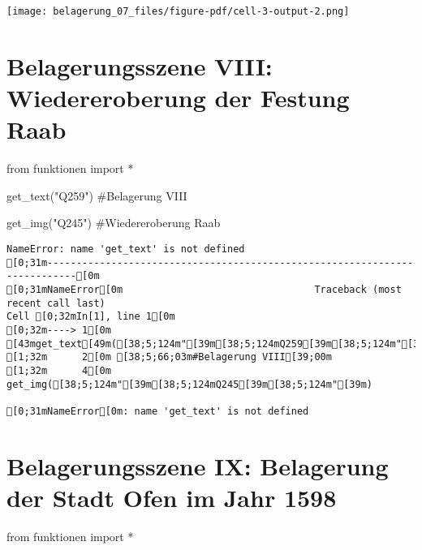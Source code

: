 \documentclass[
  a4paper,
  portrait]{book}
\newenvironment{Shaded}{\begin{snugshade}}{\end{snugshade}}
\newcommand{\CommentTok}[1]{\textcolor[rgb]{0.37,0.37,0.37}{#1}}
\newcommand{\ImportTok}[1]{\textcolor[rgb]{0.00,0.46,0.62}{#1}}
\newcommand{\NormalTok}[1]{\textcolor[rgb]{0.00,0.23,0.31}{#1}}
\newcommand{\OperatorTok}[1]{\textcolor[rgb]{0.37,0.37,0.37}{#1}}
\newcommand{\StringTok}[1]{\textcolor[rgb]{0.13,0.47,0.30}{#1}}
\begin{document}
\texttt{[image: belagerung\_07\_files/figure-pdf/cell-3-output-2.png]}

\chapter{Belagerungsszene VIII: Wiedereroberung der Festung
Raab}\label{belagerungsszene-viii-wiedereroberung-der-festung-raab}

\begin{Shaded}
\begin{Highlighting}[]
\ImportTok{from}\NormalTok{ funktionen }\ImportTok{import} \OperatorTok{*}
\end{Highlighting}
\end{Shaded}

\begin{Shaded}
\begin{Highlighting}[]
\NormalTok{get\_text(}\StringTok{"Q259"}\NormalTok{)}
\CommentTok{\#Belagerung VIII}

\NormalTok{get\_img(}\StringTok{"Q245"}\NormalTok{)}
\CommentTok{\#Wiedereroberung Raab }
\end{Highlighting}
\end{Shaded}

\begin{verbatim}
NameError: name 'get_text' is not defined
[0;31m---------------------------------------------------------------------------[0m
[0;31mNameError[0m                                 Traceback (most recent call last)
Cell [0;32mIn[1], line 1[0m
[0;32m----> 1[0m [43mget_text[49m([38;5;124m"[39m[38;5;124mQ259[39m[38;5;124m"[39m)
[1;32m      2[0m [38;5;66;03m#Belagerung VIII[39;00m
[1;32m      4[0m get_img([38;5;124m"[39m[38;5;124mQ245[39m[38;5;124m"[39m)

[0;31mNameError[0m: name 'get_text' is not defined
\end{verbatim}

\chapter{Belagerungsszene IX: Belagerung der Stadt Ofen im Jahr
1598}\label{belagerungsszene-ix-belagerung-der-stadt-ofen-im-jahr-1598}

\begin{Shaded}
\begin{Highlighting}[]
\ImportTok{from}\NormalTok{ funktionen }\ImportTok{import} \OperatorTok{*}
\end{Highlighting}
\end{Shaded}
\end{document}

